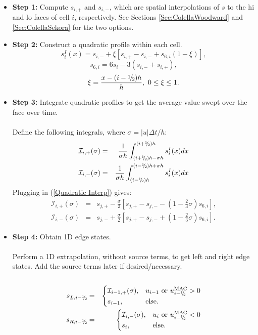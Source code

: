 \begin{itemize}
\item {\bf Step 1:} Compute $s_{i,+}$ and $s_{i,-}$, which are spatial interpolations of
$s$ to the hi and lo faces of cell $i$, respectively.  See Sections 
\ref{Sec:ColellaWoodward} and \ref{Sec:ColellaSekora} for the two options.
\item {\bf Step 2:} Construct a quadratic profile within each cell.
\begin{equation}
s_i^I(x) = s_{i,-} + \xi\left[s_{i,+} - s_{i,-} + s_{6,i}(1-\xi)\right],\label{Quadratic Interp}
\end{equation}
\begin{equation}
s_{6,i}= 6s_{i} - 3\left(s_{i,-}+s_{i,+}\right),
\end{equation}
\begin{equation}
\xi = \frac{x - (i-\myhalf)h}{h}, ~ 0 \le \xi \le 1.
\end{equation}
\item {\bf Step 3:} Integrate quadratic profiles to get the average value swept over the face
over time.\\ \\
Define the following integrals, where $\sigma = |u|\Delta t/h$:
\begin{eqnarray}
\mathcal{I}_{i,+}(\sigma) &=& \frac{1}{\sigma h}\int_{(i+\myhalf)h-\sigma h}^{(i+\myhalf)h}s_i^I(x)dx \\
\mathcal{I}_{i,-}(\sigma) &=& \frac{1}{\sigma h}\int_{(i-\myhalf)h}^{(i-\myhalf)h+\sigma h}s_i^I(x)dx
\end{eqnarray}
Plugging in (\ref{Quadratic Interp}) gives:
\begin{eqnarray}
\mathcal{I}_{i,+}(\sigma) &=& s_{j,+} - \frac{\sigma}{2}\left[s_{j,+}-s_{j,-}-\left(1-\frac{2}{3}\sigma\right)s_{6,i}\right], \\
\mathcal{I}_{i,-}(\sigma) &=& s_{j,-} + \frac{\sigma}{2}\left[s_{j,+}-s_{j,-}+\left(1-\frac{2}{3}\sigma\right)s_{6,i}\right].
\end{eqnarray}
\item {\bf Step 4:} Obtain 1D edge states.\\ \\
Perform a 1D extrapolation, without source terms, to get 
left and right edge states.  Add the source terms later if desired/necessary.\\ \\
\begin{eqnarray}
s_{L,i-\myhalf} &=&
\begin{cases}
\mathcal{I}_{i-1,+}(\sigma), & u_{i-1} ~ \text{or} ~ u_{i-\myhalf}^{\mac} > 0 \\
s_{i-1}, & \text{else}.
\end{cases}\\
s_{R,i-\myhalf} &=& 
\begin{cases}
\mathcal{I}_{i,-}(\sigma), & u_{i} ~ \text{or} ~ u_{i-\myhalf}^{\mac} < 0 \\
s_{i}, & \text{else}.
\end{cases}
\end{eqnarray}
\end{itemize}

